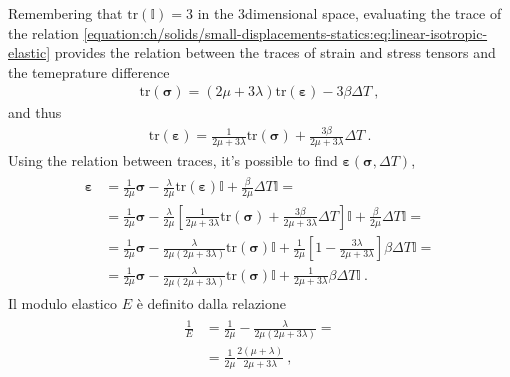 \documentclass[letterpaper,10pt,english]{jupyterBook}
\begin{document}
\sphinxAtStartPar
Remembering that \(\text{tr}(\mathbb{I}) = 3\) in the 3\sphinxhyphen{}dimensional space, evaluating the trace of the relation \eqref{equation:ch/solids/small-displacements-statics:eq:linear-isotropic-elastic} provides the relation between the traces of strain and stress tensors and the temeprature difference
\begin{equation*}
\begin{split}\text{tr} (\symbf{\sigma}) = \left( 2 \mu + 3 \lambda \right) \text{tr} (\symbf{\varepsilon}) - 3 \beta \Delta T \ , \end{split}
\end{equation*}
\sphinxAtStartPar
and thus
\begin{equation*}
\begin{split}\text{tr} (\symbf{\varepsilon}) = \frac{1}{ 2 \mu + 3 \lambda} \text{tr} (\symbf{\sigma}) + \frac{3 \beta}{ 2 \mu + 3 \lambda} \Delta T \ . \end{split}
\end{equation*}
\sphinxAtStartPar
Using the relation between traces, it’s possible to find \(\symbf{\varepsilon}\left(\symbf{\sigma}, \Delta T \right)\),
\begin{equation*}
\begin{split}\begin{aligned}
  \symbf{\varepsilon}
  & = \frac{1}{2 \mu} \symbf{\sigma} - \frac{\lambda}{2\mu} \text{tr}(\symbf{\varepsilon}) \mathbb{I} + \frac{\beta}{2 \mu} \Delta T \mathbb{I} = \\
  & = \frac{1}{2 \mu} \symbf{\sigma} - \frac{\lambda}{2\mu} \left[ \frac{1}{2 \mu + 3 \lambda} \text{tr}(\symbf{\sigma}) + \frac{3 \beta}{2 \mu + 3 \lambda} \Delta T \right] \mathbb{I} + \frac{\beta}{2 \mu} \Delta T \mathbb{I} = \\
  & = \frac{1}{2 \mu} \symbf{\sigma} - \frac{\lambda}{2\mu ( 2 \mu + 3 \lambda)} \text{tr}(\symbf{\sigma}) \mathbb{I} + \frac{1}{2 \mu}\left[ 1 - \frac{3 \lambda}{2 \mu + 3 \lambda} \right] \beta \Delta T \mathbb{I} = \\
  & = \frac{1}{2 \mu} \symbf{\sigma} - \frac{\lambda}{2\mu ( 2 \mu + 3 \lambda)} \text{tr}(\symbf{\sigma}) \mathbb{I} + \frac{1}{2 \mu + 3 \lambda}  \beta \Delta T \mathbb{I} \ .
\end{aligned}\end{split}
\end{equation*}
\sphinxAtStartPar
{} Il modulo elastico \(E\) è definito dalla relazione
\begin{equation*}
\begin{split}\begin{aligned}
  \frac{1}{E} 
  & = \frac{1}{2 \mu} - \frac{\lambda}{2 \mu (2 \mu + 3 \lambda)} = \\
  & = \frac{1}{2 \mu} \frac{2 (\mu + \lambda)}{2 \mu + 3 \lambda} \ ,
\end{aligned}\end{split}
\end{equation*}
\end{document}
